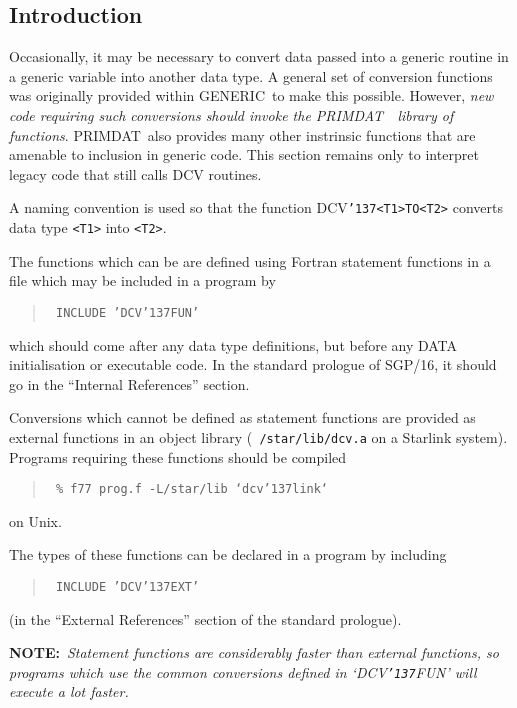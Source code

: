 \documentclass[twoside,11pt]{article}
\renewcommand{\_}{{\tt\char'137}}     %
\newcommand{\xref}[3]{#1}
\newcommand{\GENERIC}{{\footnotesize GENERIC}\normalsize}
\newcommand{\PRIMDAT}{{\footnotesize PRIMDAT}\normalsize}
\newcommand{\PRIMDATref}{\xref{\PRIMDAT}{sun39}{}~}
\begin{document}
\subsection{Introduction}

Occasionally, it may be necessary to convert data passed into a
generic routine in a generic variable into another data type. A
general set of conversion functions was originally provided within
\GENERIC\ to make this possible.  However, \emph{new code requiring such
conversions should invoke the \PRIMDATref\ library of functions}.
\PRIMDAT\ also provides many other instrinsic functions that are
amenable to inclusion in generic code.  This section remains
only to interpret legacy code that still calls DCV routines.

A naming convention is used so that the function
DCV\_\verb+<T1>TO<T2>+ converts data type \verb+<T1>+ into \verb+<T2>+.

The functions which can be are defined using Fortran statement
functions in a file which may be included in a program by

\begin{quote}{\tt
INCLUDE 'DCV\_FUN'
}
\end{quote}

which should come after any data type definitions, but before
any DATA initialisation or executable code.
In the standard prologue of SGP/16, it should go in the
``Internal References'' section.

Conversions which cannot be defined as statement functions are
provided as external functions in an object library ({\tt
/star/lib/dcv.a} on a Starlink system).  Programs requiring these
functions should be compiled

\begin{quote}{\tt
\% f77 prog.f -L/star/lib `dcv\_link`
}
\end{quote}

on Unix.

The types of these functions can be declared in a program by including

\begin{quote}{\tt
INCLUDE 'DCV\_EXT'
}
\end{quote}

(in the ``External References'' section of the standard prologue).

{\bf NOTE:}~{\it Statement functions are considerably faster than external
functions, so programs which use the common conversions defined in `DCV\_FUN'
will execute a lot faster.}
\end{document}
